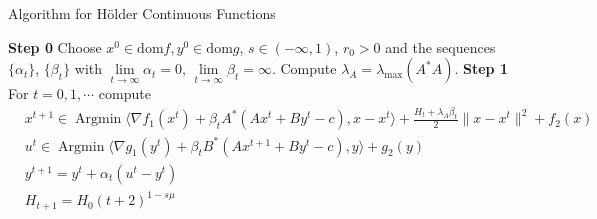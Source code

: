 \documentclass{article}
\numberwithin{equation}{section}
\def\Argmin{\mathop{\mathrm{Argmin}}}
\begin{document}
\begin{algorithm}
	\caption{ Algorithm for H\"older Continuous Functions}
	\label{alg2}
	\begin{algorithmic}
		\STATE \textbf{Step 0} Choose $x^0 \in \mathrm{dom}f, y^0 \in \mathrm{dom}g$, $s\in(-\infty,1)$, $r_0 >0$ and the sequences $\{\alpha_t\}$,
        $\{\beta_t\}$ with $\lim\limits_{t\rightarrow \infty}\alpha_t = 0$, $\lim\limits_{t\rightarrow\infty}\beta_t=\infty$. Compute $\lambda_A= \lambda_{\max}({A^*A})$.
		\STATE \textbf{Step 1} For $t=0,1,\cdots$ compute
            \begin{align}
                &x^{t+1} \in \Argmin \langle \nabla f_1(x^t) + \beta_{t}A^*(Ax^t+By^t-c), x-x^t\rangle +\frac{H_t+\lambda_{A} \beta_{t}}{2}\|x-x^t\rVert^2 +f_2(x) \label{get_xk+1_holder}  \\
                & u^t \in \Argmin \langle\nabla g_1(y^t) + \beta_{t}B^*(Ax^{t+1} +By^t-c),y\rangle +g_2(y) \label{get_uk_holder}  \\
                & y^{t+1} = y^{t} +\alpha_t(u^t-y^t)  \label{get_y_k_holder} \\
                & H_{t+1} = H_0(t+2)^{1-s\mu}
            \end{align}
	\end{algorithmic}  
\end{algorithm}
\end{document}

